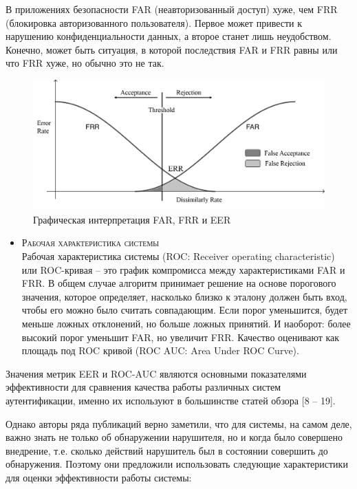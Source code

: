 \documentclass[12pt]{article}
\begin{document}
    \par В приложениях безопасности FAR (неавторизованный доступ) хуже, чем FRR (блокировка авторизованного пользователя). Первое может привести к нарушению конфиденциальности данных, а второе станет лишь неудобством. Конечно, может быть ситуация, в которой последствия FAR и FRR равны или что FRR хуже, но обычно это не так.
    \vspace{5mm}
    \begin{figure}[h!]
        \centering
        \includegraphics[width=\linewidth]{FAR_FRR_ERR.png}
        \caption{Графическая интерпретация FAR, FRR и EER}
        \label{sec:Overview:Metrics:fig:FAR_FRR_EER}
    \end{figure}

    \begin{itemize}
        \item \textsc{Рабочая характеристика системы} \\
        Рабочая характеристика системы (ROC: Receiver operating characteristic) или ROC-кривая \cite{ROC} -- это график компромисса между характеристиками FAR и FRR. В общем случае алгоритм принимает решение на основе порогового значения, которое определяет, насколько близко к эталону должен быть вход, чтобы его можно было считать совпадающим. Если порог уменьшится, будет меньше ложных отклонений, но больше ложных принятий. И наоборот: более высокий порог уменьшит FAR, но увеличит FRR. Качество оценивают как площадь под ROC кривой (ROC AUC: Area Under ROC Curve).
    \end{itemize}

    \par Значения метрик EER и ROC-AUC являются основными показателями эффективности для сравнения качества работы различных систем аутентификации, именно их используют в большинстве статей обзора [8 -- 19].

    \par Однако авторы ряда публикаций \cite{Mondal, Mondal_2, Mondal_3} верно заметили, что для системы, на самом деле, важно знать не только об обнаружении нарушителя, но и когда было совершено внедрение, т.е. сколько действий нарушитель был в состоянии совершить до обнаружения. Поэтому они предложили использовать следующие характеристики для оценки эффективности работы системы:
\end{document}
